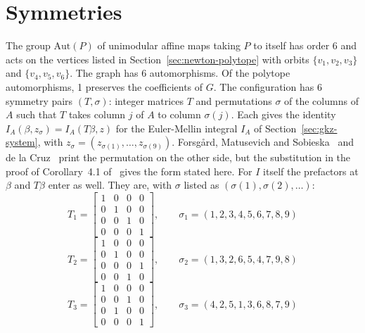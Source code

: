 \documentclass[11pt,a4paper]{article}
\begin{document}
\section{Symmetries}
The group $\mathrm{Aut}(P)$ of unimodular affine maps taking $P$ to itself has order 6 and acts on the vertices listed in Section~\ref{sec:newton-polytope} with orbits $\{v_{1}, v_{2}, v_{3}\}$ and $\{v_{4}, v_{5}, v_{6}\}$. The graph has 6 automorphisms. Of the polytope automorphisms, 1 preserves the coefficients of $G$.
The configuration has 6 symmetry pairs $(T, \sigma)$: integer matrices $T$ and permutations $\sigma$ of the columns of $A$ such that $T$ takes column $j$ of $A$ to column $\sigma(j)$. Each gives the identity $I_A(\beta, z_\sigma) = I_A(T\beta, z)$ for the Euler-Mellin integral $I_A$ of Section~\ref{sec:gkz-system}, with $z_\sigma = (z_{\sigma(1)}, \ldots, z_{\sigma(9)})$. Forsg\aa rd, Matusevich and Sobieska~\cite{fms2019} and de la Cruz~\cite{delacruz2024} print the permutation on the other side, but the substitution in the proof of Corollary~4.1 of~\cite{fms2019} gives the form stated here. For $I$ itself the prefactors at $\beta$ and $T\beta$ enter as well. They are, with $\sigma$ listed as $(\sigma(1), \sigma(2), \ldots)$:
\begin{equation*}
T_{1} = \begin{bmatrix}
1 & 0 & 0 & 0 \\
0 & 1 & 0 & 0 \\
0 & 0 & 1 & 0 \\
0 & 0 & 0 & 1
\end{bmatrix}, \qquad \sigma_{1} = (1, 2, 3, 4, 5, 6, 7, 8, 9)
\end{equation*}
\begin{equation*}
T_{2} = \begin{bmatrix}
1 & 0 & 0 & 0 \\
0 & 1 & 0 & 0 \\
0 & 0 & 0 & 1 \\
0 & 0 & 1 & 0
\end{bmatrix}, \qquad \sigma_{2} = (1, 3, 2, 6, 5, 4, 7, 9, 8)
\end{equation*}
\begin{equation*}
T_{3} = \begin{bmatrix}
1 & 0 & 0 & 0 \\
0 & 0 & 1 & 0 \\
0 & 1 & 0 & 0 \\
0 & 0 & 0 & 1
\end{bmatrix}, \qquad \sigma_{3} = (4, 2, 5, 1, 3, 6, 8, 7, 9)
\end{equation*}
\end{document}
